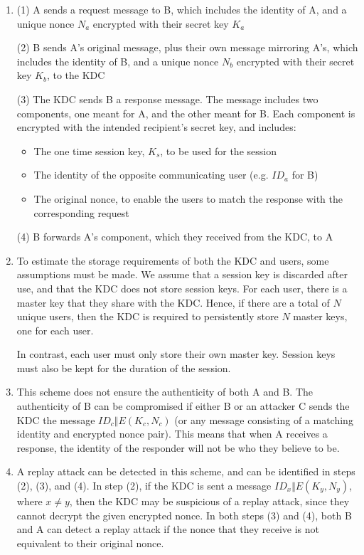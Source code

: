 \documentclass[12pt]{article}
\begin{document}
\begin{enumerate}
\item (1) A sends a request message to B, which includes the identity of A, and a unique nonce $N_{a}$
encrypted with their secret key $K_{a}$

(2) B sends A's original message, plus their own message mirroring A's, which includes the identity of B,
and a unique nonce $N_{b}$ encrypted with their secret key $K_{b}$, to the KDC

(3) The KDC sends B a response message. The message includes two components, one meant for A, and the other meant for B.
Each component is encrypted with the intended recipient's secret key, and includes:
\begin{itemize}
	\item The one time session key, $K_{s}$, to be used for the session
	\item The identity of the opposite communicating user (e.g. $ID_{a}$ for B)
	\item The original nonce, to enable the users to match the response with the corresponding request
\end{itemize}

(4) B forwards A's component, which they received from the KDC, to A 


\item To estimate the storage requirements of both the KDC and users, some assumptions must be made.
We assume that a session key is discarded after use, and that the KDC does not store session keys. For each
user, there is a master key that they share with the KDC. Hence, if there are a total of $N$ unique users, then
the KDC is required to persistently store $N$ master keys, one for each user.

In contrast, each user must only store their own master key. Session keys must also be kept for the
duration of the session.

\item This scheme does not ensure the authenticity of both A and B. The authenticity of B can be compromised if
either B or an attacker C sends the KDC the message $ID_{c} \Vert E(K_{c}, N_{c})$ (or any message consisting of a
matching identity and encrypted nonce pair). This means that when A receives a response, the identity of the 
responder will not be who they believe to be.

\item A replay attack can be detected in this scheme, and can be identified in steps (2), (3), and (4). In step (2), if the KDC
is sent a message $ID_{x} \Vert E(K_{y}, N_{y})$, where $x \neq y$, then the KDC may be suspicious of a replay
attack, since they cannot decrypt the given encrypted nonce. In both steps (3) and (4), both B and A can detect a replay
attack if the nonce that they receive is not equivalent to their original nonce.

\end{enumerate}
\end{document}
